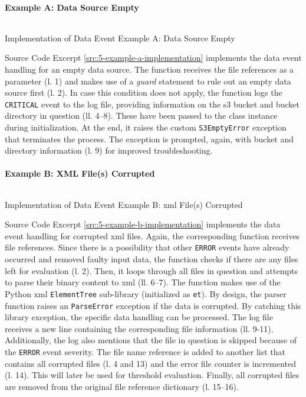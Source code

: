 \paragraph{Example A: Data Source Empty}
\begin{listing}[h!]
	\inputminted{python}{main-matter/src/5-a.py}
	\caption{Implementation of Data Event Example A: Data Source Empty}
	\label{src:5-example-a-implementation}
\end{listing}
Source Code Excerpt \ref{src:5-example-a-implementation} implements the data event handling for an empty data source. The function receives the file references as a parameter (l. 1) and makes use of a \textit{guard} statement to rule out an empty data source first (l. 2). In case this condition does not apply, the function logs the \texttt{CRITICAL} event to the log file, providing information on the \ac{s3} bucket and bucket directory in question (ll. 4--8). These have been passed to the class instance during initialization. At the end, it raises the custom \texttt{S3EmptyError} exception that terminates the process. The exception is prompted, again, with bucket and directory information (l. 9) for improved troubleshooting.
\newpage
\paragraph{Example B: XML File(s) Corrupted}
\begin{listing}[h!]
	\inputminted{python}{main-matter/src/5-b.py}
	\caption{Implementation of Data Event Example B: \acs{xml} File(s) Corrupted}
	\label{src:5-example-b-implementation}
\end{listing}
Source Code Excerpt \ref{src:5-example-b-implementation} implements the data event handling for corrupted \ac{xml} files. Again, the corresponding function receives file references. Since there is a possibility that other \texttt{ERROR} events have already occurred and removed faulty input data, the function checks if there are any files left for evaluation (l. 2). Then, it loops through all files in question and attempts to parse their binary content to \ac{xml} (ll. 6--7). The function makes use of the Python \ac{xml} \texttt{ElementTree} sub-library (initialized as \texttt{et}). By design, the parser function raises an \texttt{ParseError} exception if the data is corrupted. By catching this library exception, the specific data handling can be processed. The log file receives a new line containing the corresponding file information (ll. 9-11). Additionally, the log also mentions that the file in question is skipped because of the \texttt{ERROR} event severity. The file name reference is added to another list that contains all corrupted files (l. 4 and 13) and the error file counter is incremented (l. 14). This will later be used for threshold evaluation. Finally, all corrupted files are removed from the original file reference dictionary (l. 15--16).
\newpage
